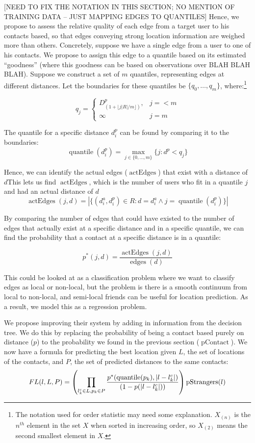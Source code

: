\documentclass[letterpaper]{article}
\DeclareMathOperator{\pContact}{pContact}
\DeclareMathOperator{\pStrangers}{pStrangers}
\DeclareMathOperator{\edges}{edges}
\DeclareMathOperator{\actEdges}{actEdges}
\DeclareMathOperator{\quantile}{quantile}
\begin{document}
[NEED TO FIX THE NOTATION IN THIS SECTION; NO MENTION OF TRAINING DATA -- JUST MAPPING EDGES TO QUANTILES]
Hence, we propose to assess the relative quality of each edge from a target user to his contacts based, so that edges conveying strong location information are weighed more than others. Concretely, suppose we have a single edge from a user to one of his contacts. We propose to assign this edge to a quantile based on its estimated ``goodness'' (where this goodness can be based on observations over BLAH BLAH BLAH). Suppose we construct a set of $m$ quantiles, representing edges at different distances. Let the boundaries for these quantiles be  $\{q_0,\dots,q_m\}$, where:\footnote{The notation used for order statistic may need some explanation.  $X_{(n)}$ is the $n^{th}$ element in the set $X$ when sorted in increasing order, so $X_{(2)}$ means the second smallest element in $X$.}

\[
    q_j =
    \begin{cases}
        D^p_{(1+\lfloor j|R|/m \rfloor)}, & j=<m \\
        \infty & j=m
    \end{cases}
\]

\noindent The quantile for a specific distance $d^p_i$ can be found by comparing it to the boundaries:
\[
    \quantile(d^p_i) = \max_{j \in \{0,\dots,m\}} \{j: d^p<q_j\}
\]

Hence, we can identify the actual edges ($\actEdges$) that exist with a distance of $d$This lets us find $\actEdges$, which is the number of users who fit in a quantile $j$ and had an actual distance of $d$
\[
    \actEdges(j,d) = |\{
            (d^a_i,d^p_i) \in R :
            d=d^a_i \wedge j=\quantile(d^p_i)
        \}|
\]

By comparing the number of edges that could have existed to the number of edges that actually exist at a specific distance and in a specific quantile, we can find the probability that a contact at a specific distance is in a quantile:

\[
p^*(j,d) = \frac{\actEdges(j,d)}{\edges(d)}
\]

This could be looked at as a classification problem where we want to classify edges as local or non-local, but the problem is there is a smooth continuum from local to non-local, and semi-local friends can be useful for location prediction. As a result, we model this as a regression problem. 





We propose improving their system by adding in information from the decision tree. We do this by replacing the probability of being a contact based purely on distance ($p$) to the probability we found in the previous section ($\pContact$). We now have a formula for predicting the best location given $L$, the set of locations of the contacts, and $P$, the set of predicted distances to the same
contacts:
\[
    FL(l,L,P) =
        \left(
            \prod_{l^c_k \in L,p_k \in P}
            {p^*(\quantile(p_k),|l-l^c_k|) \over (1-p(|l-l^c_k|))}
        \right)
        \pStrangers(l)
\]
\end{document}
